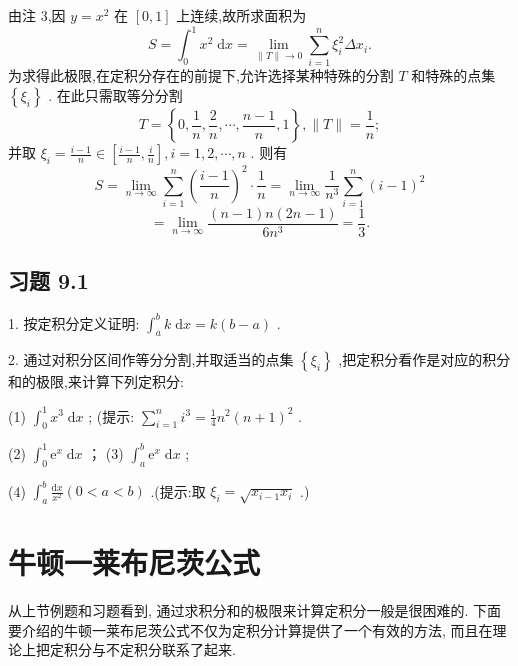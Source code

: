 \begin{solution}

\end{solution}
由注 3,因 \(y = {x}^{2}\) 在 \(\left\lbrack  {0,1}\right\rbrack\) 上连续,故所求面积为
\[
S = {\int }_{0}^{1}{x}^{2}\mathrm{\;d}x = \mathop{\lim }\limits_{{\parallel T\parallel  \rightarrow  0}}\mathop{\sum }\limits_{{i = 1}}^{n}{\xi }_{i}^{2}\Delta {x}_{i}.
\]
为求得此极限,在定积分存在的前提下,允许选择某种特殊的分割 \(T\) 和特殊的点集 \(\left\{  {\xi }_{i}\right\}\) . 在此只需取等分分割
\[
T = \left\{  {0,\frac{1}{n},\frac{2}{n},\cdots ,\frac{n - 1}{n},1}\right\}  ,\parallel T\parallel  = \frac{1}{n};
\]
并取 \({\xi }_{i} = \frac{i - 1}{n} \in  \left\lbrack  {\frac{i - 1}{n},\frac{i}{n}}\right\rbrack  ,i = 1,2,\cdots ,n\) . 则有
\[
S = \mathop{\lim }\limits_{{n \rightarrow  \infty }}\mathop{\sum }\limits_{{i = 1}}^{n}{\left( \frac{i - 1}{n}\right) }^{2} \cdot  \frac{1}{n} = \mathop{\lim }\limits_{{n \rightarrow  \infty }}\frac{1}{{n}^{3}}\mathop{\sum }\limits_{{i = 1}}^{n}{\left( i - 1\right) }^{2}
\]
\[
= \mathop{\lim }\limits_{{n \rightarrow  \infty }}\frac{\left( {n - 1}\right) n\left( {{2n} - 1}\right) }{6{n}^{3}} = \frac{1}{3}.
\]
\subsection{习题 9.1}

1. 按定积分定义证明: \({\int }_{a}^{b}k\mathrm{\;d}x = k\left( {b - a}\right)\) .

2. 通过对积分区间作等分分割,并取适当的点集 \(\left\{  {\xi }_{i}\right\}\) ,把定积分看作是对应的积分和的极限,来计算下列定积分:

(1) \({\int }_{0}^{1}{x}^{3}\mathrm{\;d}x\) ; (提示: \(\mathop{\sum }\limits_{{i = 1}}^{n}{i}^{3} = \frac{1}{4}{n}^{2}{\left( n + 1\right) }^{2}\) .

(2) \({\int }_{0}^{1}{\mathrm{e}}^{x}\mathrm{\;d}x\) ； (3) \({\int }_{a}^{b}{\mathrm{e}}^{x}\mathrm{\;d}x\) ;

(4) \({\int }_{a}^{b}\frac{\mathrm{d}x}{{x}^{2}}\left( {0 < a < b}\right)\) .(提示:取 \({\xi }_{i} = \sqrt{{x}_{i - 1}{x}_{i}}\) .)

\section{牛顿一莱布尼茨公式}

从上节例题和习题看到, 通过求积分和的极限来计算定积分一般是很困难的. 下面要介绍的牛顿一莱布尼茨公式不仅为定积分计算提供了一个有效的方法, 而且在理论上把定积分与不定积分联系了起来.

